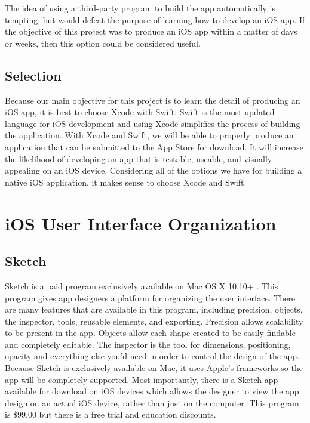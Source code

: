 \documentclass[letterpaper,10pt,draftclsnofoot,onecolumn,titlepage]{IEEEtran}
\begin{document}
	The idea of using a third-party program to build the app automatically is tempting, but would defeat the purpose of learning how to develop an iOS app.
	If the objective of this project was to produce an iOS app within a matter of days or weeks, then this option could be considered useful.

	\subsection{Selection}
	Because our main objective for this project is to learn the detail of producing an iOS app, it is best to choose Xcode with Swift.
	Swift is the most updated language for iOS development and using Xcode simplifies the process of building the application.
	With Xcode and Swift, we will be able to properly produce an application that can be submitted to the App Store for download.
	It will increase the likelihood of developing an app that is testable, useable, and visually appealing on an iOS device.
	Considering all of the options we have for building a native iOS application, it makes sense to choose Xcode and Swift.

	\section{iOS User Interface Organization}
	\subsection{Sketch}
	Sketch is a paid program exclusively available on Mac OS X 10.10+ \cite{Sketch}.
	This program gives app designers a platform for organizing the user interface.
	There are many features that are available in this program, including precision, objects, the inspector, tools, reusable elements, and exporting.
	Precision allows scalability to be present in the app.
	Objects allow each shape created to be easily findable and completely editable.
	The inspector is the tool for dimensions, positioning, opacity and everything else you'd need in order to control the design of the app.
	Because Sketch is exclusively available on Mac, it uses Apple's frameworks so the app will be completely supported.
	Most importantly, there is a Sketch app available for download on iOS devices which allows the designer to view the app design on an actual iOS device, rather than just on the computer.
	This program is \$99.00 but there is a free trial and education discounts.
\end{document}
